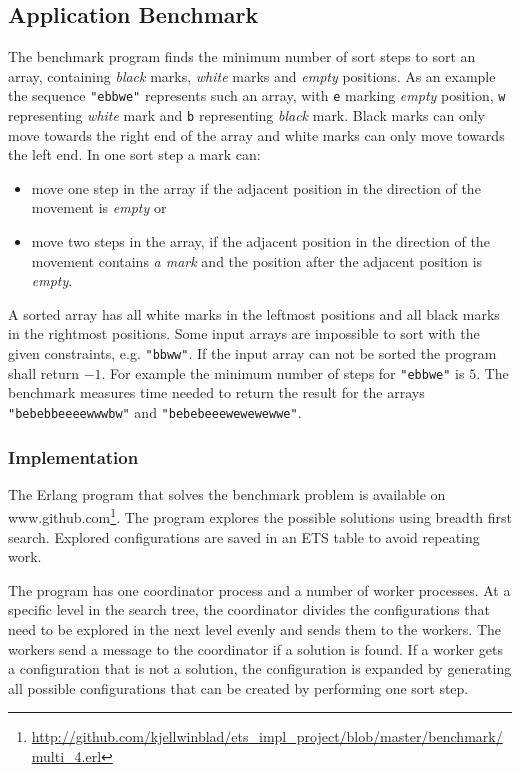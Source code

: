 \documentclass[aps,pre,preprint,nofootinbib]{revtex4}
\begin{document}

\subsection{Application Benchmark}\label{sec:application_bench}
The benchmark program finds the minimum number of sort steps to sort an array, containing \emph{black} marks, \emph{white} marks and \emph{empty} positions.
As an example the sequence \verb|"ebbwe"| represents such an array, with \verb|e| marking \emph{empty} position, \verb|w| representing \emph{white} mark and \verb|b| representing \emph{black} mark.
Black marks can only move towards the right end of the array and white marks can only move towards the left end.
In one sort step a mark can:
\begin{itemize}
\item move one step in the array if the adjacent position in the direction of the movement is \emph{empty} or
\item move two steps in the array, if the adjacent position in the direction of the movement contains \emph{a mark} and the position after the adjacent position is \emph{empty}.
\end{itemize}
A sorted array has all white marks in the leftmost positions and all black marks in the rightmost positions.
Some input arrays are impossible to sort with the given constraints, e.g. \verb|"bbww"|.
If the input array can not be sorted the program shall return $-1$.
For example the minimum number of steps for \verb|"ebbwe"| is $5$.
The benchmark measures time needed to return the result for the arrays \verb|"bebebbeeeewwwbw"| and \verb|"bebebeeewewewewwe"|.

\subsubsection{Implementation}
The Erlang program that solves the benchmark problem is available on www.github.com\footnote{\url{http://github.com/kjellwinblad/ets\_impl\_project/blob/master/benchmark/multi\_4.erl}}.
The program explores the possible solutions using breadth first search.
Explored configurations are saved in an ETS table to avoid repeating work.

The program has one coordinator process and a number of worker processes.
At a specific level in the search tree, the coordinator divides the configurations that need to be explored in the next level evenly and sends them to the workers.
The workers send a message to the coordinator if a solution is found.
If a worker gets a configuration that is not a solution, the configuration is expanded by generating all possible configurations that can be created by performing one sort step.
\end{document}
